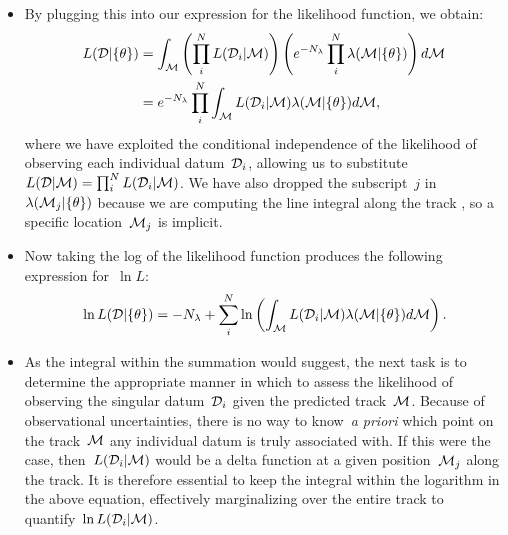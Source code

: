 \documentclass[ms.tex]{subfiles}
\begin{document}
\begin{itemize}
	\item By plugging this into our expression for the likelihood function,
	we obtain:
	\begin{subequations}\begin{align}
	L(\mathcal{D} | \{\theta\}) &=
	\int_{\mathcal{M}} \left(\prod_i^N L(\mathcal{D}_i | \mathcal{M})\right)
	\left(e^{-N_\lambda}\prod_i^N \lambda(\mathcal{M} | \{\theta\})\right)
	d\mathcal{M}
	\\
	&= e^{-N_\lambda} \prod_i^N \int_{\mathcal{M}}
	L(\mathcal{D}_i | \mathcal{M}) \lambda(\mathcal{M} | \{\theta\}) d\mathcal{M},
	\label{eq:L_product}
	\end{align}\end{subequations}
	where we have exploited the conditional independence of the likelihood of
	observing each individual datum~$\mathcal{D}_i$, allowing us to substitute
	$L(\mathcal{D} | \mathcal{M}) = \prod_i^N L(\mathcal{D}_i | \mathcal{M})$.
	We have also dropped the subscript~$j$ in~$\lambda(\mathcal{M}_j |
	\{\theta\})$ because we are computing the line integral along the track
	, so a specific location~$\mathcal{M}_j$ is implicit.

	\item Now taking the log of the likelihood function produces the following
	expression for~$\ln L$:
	\begin{equation}
	\ln L(\mathcal{D} | \{\theta\}) = -N_\lambda + \sum_i^N \ln
	\left(\int_{\mathcal{M}} L(\mathcal{D}_i | \mathcal{M})
	\lambda(\mathcal{M} | \{\theta\})d\mathcal{M}\right).
	\label{eq:lnL_integral}
	\end{equation}

	\item As the integral within the summation would suggest, the next task is
	to determine the appropriate manner in which to assess the likelihood of
	observing the singular datum~$\mathcal{D}_i$ given the predicted
	track~$\mathcal{M}$.
	Because of observational uncertainties, there is no way to know~\textit{a
	priori} which point on the track~$\mathcal{M}$ any individual datum is truly
	associated with.
	If this were the case, then~$L(\mathcal{D}_i | \mathcal{M})$ would be a
	delta function at a given position~$\mathcal{M}_j$ along the track.
	It is therefore essential to keep the integral within the logarithm in the
	above equation, effectively marginalizing over the entire track to
	quantify~$\ln L(\mathcal{D}_i | \mathcal{M})$.
	

\end{itemize}
\end{document}
